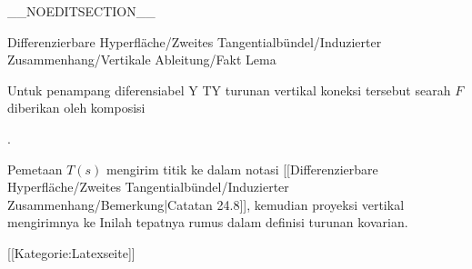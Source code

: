 __NOEDITSECTION__

{Differenzierbare Hyperfläche/Zweites Tangentialbündel/Induzierter Zusammenhang/Vertikale Ableitung/Fakt}
{Lema}
{}
{

\faktzusatz {}
\faktzusatz {}

}
{

Untuk penampang diferensiabel
 { Y } { TY
} {}
turunan vertikal koneksi tersebut searah $F$ diberikan oleh komposisi

 { . }

Pemetaan $T(s)$ mengirim titik
 ke
 dalam notasi
[[Differenzierbare Hyperfläche/Zweites Tangentialbündel/Induzierter Zusammenhang/Bemerkung|Catatan 24.8]],
kemudian proyeksi vertikal mengirimnya ke
Inilah tepatnya rumus dalam definisi turunan kovarian.

}

 [[Kategorie:Latexseite]]
